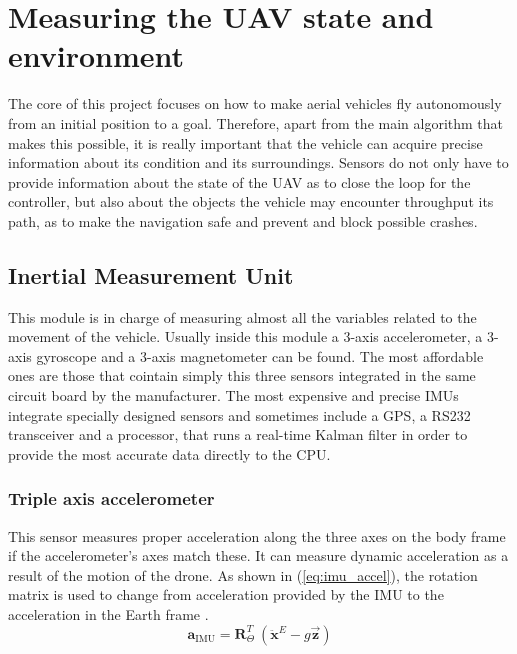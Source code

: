 \documentclass[journal]{IEEEtran}
\newcommand*{\subb}[1]{_{\mathrm{#1}}}
\begin{document}
	\section{Measuring the UAV state and environment}
	The core of this project focuses on how to make aerial vehicles fly autonomously from an initial position to a goal. Therefore, apart from the main algorithm that makes this possible, it is really important that the vehicle can acquire precise information about its condition and its surroundings. Sensors do not only have to provide information about the state of the UAV as to close the loop for the controller, but also about the objects the vehicle may encounter throughput its path, as to make the navigation safe and prevent and block possible crashes.\\

		\subsection{Inertial Measurement Unit}
		This module is in charge of measuring almost all the variables related to the movement of the vehicle. Usually inside this module  a 3-axis accelerometer, a 3-axis gyroscope and a 3-axis magnetometer can be found. The most affordable ones are those that cointain simply this three sensors integrated in the same circuit board by the manufacturer. The most expensive and precise IMUs integrate specially designed sensors and sometimes include a GPS, a RS232 transceiver and a processor, that runs a real-time Kalman filter in order to provide the most accurate data directly to the CPU. \\
		

		\subsubsection{Triple axis accelerometer} This sensor measures proper acceleration along the three axes on the body frame if the accelerometer's axes match these. It can measure dynamic acceleration as a result of the motion of the drone.  As shown in (\ref{eq:imu_accel}), the rotation matrix is used to change from acceleration provided by the IMU to the acceleration in the Earth frame \cite{modelling_control_mahony}.\\
		\begin{equation} \label{eq:imu_accel}
		\bm{a}\subb{IMU}= \bm{R}^T_\Theta \ (\bm{\ddot{x}}^E - g \bm{\vec{z}})
		\end{equation}
		
\end{document}
